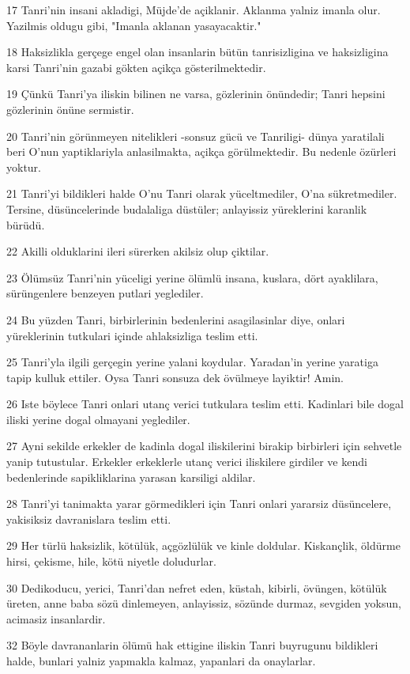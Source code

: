 \par 17 Tanri'nin insani akladigi, Müjde'de açiklanir. Aklanma yalniz imanla olur. Yazilmis oldugu gibi, "Imanla aklanan yasayacaktir."
\par 18 Haksizlikla gerçege engel olan insanlarin bütün tanrisizligina ve haksizligina karsi Tanri'nin gazabi gökten açikça gösterilmektedir.
\par 19 Çünkü Tanri'ya iliskin bilinen ne varsa, gözlerinin önündedir; Tanri hepsini gözlerinin önüne sermistir.
\par 20 Tanri'nin görünmeyen nitelikleri -sonsuz gücü ve Tanriligi- dünya yaratilali beri O'nun yaptiklariyla anlasilmakta, açikça görülmektedir. Bu nedenle özürleri yoktur.
\par 21 Tanri'yi bildikleri halde O'nu Tanri olarak yüceltmediler, O'na sükretmediler. Tersine, düsüncelerinde budalaliga düstüler; anlayissiz yüreklerini karanlik bürüdü.
\par 22 Akilli olduklarini ileri sürerken akilsiz olup çiktilar.
\par 23 Ölümsüz Tanri'nin yüceligi yerine ölümlü insana, kuslara, dört ayaklilara, sürüngenlere benzeyen putlari yeglediler.
\par 24 Bu yüzden Tanri, birbirlerinin bedenlerini asagilasinlar diye, onlari yüreklerinin tutkulari içinde ahlaksizliga teslim etti.
\par 25 Tanri'yla ilgili gerçegin yerine yalani koydular. Yaradan'in yerine yaratiga tapip kulluk ettiler. Oysa Tanri sonsuza dek övülmeye layiktir! Amin.
\par 26 Iste böylece Tanri onlari utanç verici tutkulara teslim etti. Kadinlari bile dogal iliski yerine dogal olmayani yeglediler.
\par 27 Ayni sekilde erkekler de kadinla dogal iliskilerini birakip birbirleri için sehvetle yanip tutustular. Erkekler erkeklerle utanç verici iliskilere girdiler ve kendi bedenlerinde sapikliklarina yarasan karsiligi aldilar.
\par 28 Tanri'yi tanimakta yarar görmedikleri için Tanri onlari yararsiz düsüncelere, yakisiksiz davranislara teslim etti.
\par 29 Her türlü haksizlik, kötülük, açgözlülük ve kinle doldular. Kiskançlik, öldürme hirsi, çekisme, hile, kötü niyetle doludurlar.
\par 30 Dedikoducu, yerici, Tanri'dan nefret eden, küstah, kibirli, övüngen, kötülük üreten, anne baba sözü dinlemeyen, anlayissiz, sözünde durmaz, sevgiden yoksun, acimasiz insanlardir.
\par 32 Böyle davrananlarin ölümü hak ettigine iliskin Tanri buyrugunu bildikleri halde, bunlari yalniz yapmakla kalmaz, yapanlari da onaylarlar.

